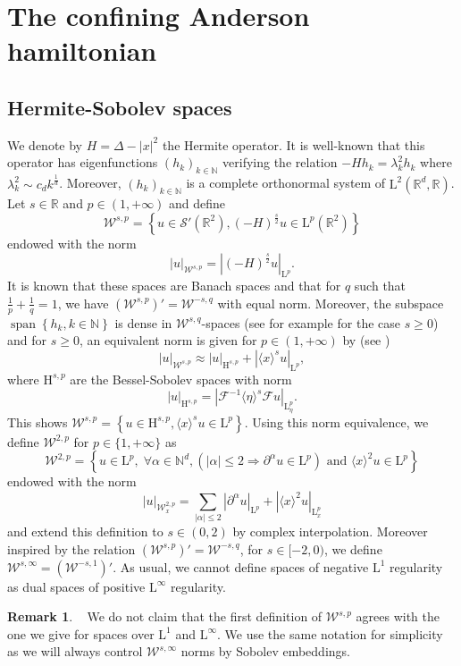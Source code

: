\documentclass{article}
\def\W{\mathcal W}
\def\R{\mathbb R}
\def\N{\mathbb N}
\def\L{\mathrm L}
\def\H{\mathrm H}
\def \F{\mathcal{F}}
\def \p {\partial}
\DeclareMathOperator{\vspan}{span}
\theoremstyle{definition}
\newtheorem{rem}[theo]{Remark}
\numberwithin{equation}{section}
\begin{document}
\section{The confining Anderson hamiltonian}

\subsection{Hermite-Sobolev spaces}\label{Sub:Confining_potential}

We denote by $H=\Delta-|x|^2$ the Hermite operator. It is well-known that this operator has eigenfunctions $(h_k)_{k\in\N}$ verifying the relation $-H h_k = \lambda_k^2 h_k$ where $\lambda_k^2\sim c_d k^{\frac{1}{d}}$. Moreover, $(h_k)_{k\in\N}$ is a complete orthonormal system of $\L^2(\mathbb{R}^d,\R)$.\\

Let $s\in\R$ and $p\in(1,+\infty)$ and define
$$\W^{s,p} =\left\{u\in\mathcal{S}'(\mathbb{R}^2), (-H)^{\frac{s}{2}}u\in\L^p(\mathbb{R}^2)\right\}$$
endowed with the norm $$|u|_{\W^{s,p}} = |(-H)^{\frac{s}{2}}u|_{\L^p}.$$
It is known that these spaces are Banach spaces and that for $q$ such that $\frac{1}{p}+\frac{1}{q}=1$, we have $\left(\W^{s,p}\right)'=\W^{-s,q}$ with equal norm. Moreover, the subspace $\vspan\left\{h_k, k\in\N\right\}$ is dense in $\W^{s,q}$-spaces (see for example \cite{BongioanniHSspaces} for the case $s\geqslant0$) and for $s\geqslant0$, an equivalent norm is given for $p\in(1,+\infty)$ by (see \cite{Dziubanski})
$$|u|_{\W^{s,p}}\approx|u|_{\H^{s,p}}+|\langle x\rangle^s u|_{\L^p},$$
where $\H^{s,p}$ are the Bessel-Sobolev spaces with norm
$$|u|_{\H^{s,p}}=\left|\F^{-1}\langle \eta\rangle^{s}\F u\right|_{\L^p_\eta}.$$
This shows $\W^{s,p}=\left\{u\in \H^{s,p}, \langle x\rangle^s u\in\L^p\right\}.$ Using this norm equivalence, we define $\W^{2,p}$ for $p\in\{1,+\infty\}$ as
$$\W^{2,p} = \left\{u\in \L^p,\; \forall \alpha\in\N^d, \left(|\alpha|\leqslant 2 \Rightarrow \p^\alpha u\in\L^p\right) \text{ and } \langle x\rangle^{2} u\in\L^p\right\}$$
endowed with the norm
$$|u|_{\W^{2,p}_x} = \sum_{|\alpha|\leqslant 2}|\p^\alpha u|_{\L^p}+|\langle x\rangle^{2} u|_{\L^p_{x}}$$
and extend this definition to $s\in(0,2)$ by complex interpolation. Moreover inspired by the relation $\left(\W^{s,p}\right)'=\W^{-s,q}$, for $s\in[-2,0)$, we define $\W^{s,\infty} = \left(\W^{-s,1}\right)'$. As usual, we cannot define spaces of negative $\L^1$ regularity as dual spaces of positive $\L^\infty$ regularity.

\begin{rem}{~}
    We do not claim that the first definition of $\W^{s,p}$ agrees with the one we give for spaces over $\L^1$ and $\L^\infty$. We use the same notation for simplicity as we will always control $\W^{s,\infty}$ norms by Sobolev embeddings.
\end{rem}
\end{document}
